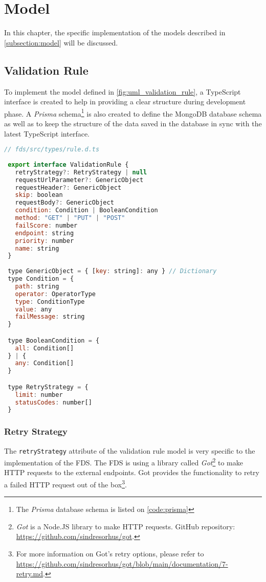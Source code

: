 \section{Model}

In this chapter, the specific implementation of the models described in \autoref{subsection:model} will be discussed. 

 \subsection{Validation Rule}
  To implement the model defined in \autoref{fig:uml_validation_rule}, a TypeScript interface is created to help in providing a clear structure during development phase. A \emph{Prisma} schema\footnote{The \emph{Prisma} database schema is listed on \autoref{code:prisma}} is also created to define the MongoDB database schema as well as to keep the structure of the data saved in the database in sync with the latest TypeScript interface. 

  \begin{lstlisting}[caption={TypeScript interface of a validation rule (TypeScript)}, language=js]
 // fds/src/types/rule.d.ts
 
 export interface ValidationRule {
   retryStrategy?: RetryStrategy | null
   requestUrlParameter?: GenericObject
   requestHeader?: GenericObject
   skip: boolean
   requestBody?: GenericObject
   condition: Condition | BooleanCondition
   method: "GET" | "PUT" | "POST" 
   failScore: number
   endpoint: string
   priority: number
   name: string
 }
 
 type GenericObject = { [key: string]: any } // Dictionary
 type Condition = {
   path: string
   operator: OperatorType
   type: ConditionType
   value: any
   failMessage: string
 }

 type BooleanCondition = {
   all: Condition[]
 } | {
   any: Condition[]
 }

 type RetryStrategy = {
   limit: number
   statusCodes: number[] 
 }
  \end{lstlisting}
 
 \subsubsection{Retry Strategy}
  The \verb;retryStrategy; attribute of the validation rule model is very specific to the implementation of the FDS. The FDS is using a library called \emph{Got}\footnote{\emph{Got} is a Node.JS library to make HTTP requests. GitHub repository: \url{https://github.com/sindresorhus/got}.} to make HTTP requests to the external endpoints. Got provides the functionality to retry a failed HTTP request out of the box\footnote{For more information on Got's retry options, please refer to \url{https://github.com/sindresorhus/got/blob/main/documentation/7-retry.md}.}.

